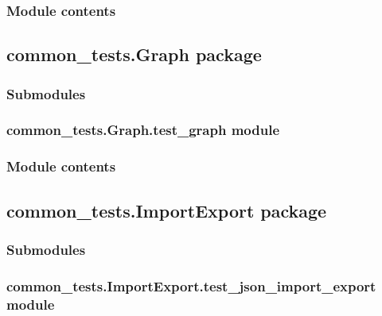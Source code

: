 \documentclass[letterpaper,10pt,english]{sphinxmanual}
\begin{document}
\subsubsection{Module contents}
\label{\detokenize{common_tests.DataTurksAlgo:module-common_tests.DataTurksAlgo}}\label{\detokenize{common_tests.DataTurksAlgo:module-contents}}

\subsection{common\_tests.Graph package}
\label{\detokenize{common_tests.Graph:common-tests-graph-package}}\label{\detokenize{common_tests.Graph::doc}}

\subsubsection{Submodules}
\label{\detokenize{common_tests.Graph:submodules}}

\subsubsection{common\_tests.Graph.test\_graph module}
\label{\detokenize{common_tests.Graph:common-tests-graph-test-graph-module}}

\subsubsection{Module contents}
\label{\detokenize{common_tests.Graph:module-common_tests.Graph}}\label{\detokenize{common_tests.Graph:module-contents}}

\subsection{common\_tests.ImportExport package}
\label{\detokenize{common_tests.ImportExport:common-tests-importexport-package}}\label{\detokenize{common_tests.ImportExport::doc}}

\subsubsection{Submodules}
\label{\detokenize{common_tests.ImportExport:submodules}}

\subsubsection{common\_tests.ImportExport.test\_json\_import\_export module}
\label{\detokenize{common_tests.ImportExport:module-common_tests.ImportExport.test_json_import_export}}\label{\detokenize{common_tests.ImportExport:common-tests-importexport-test-json-import-export-module}}
\end{document}
